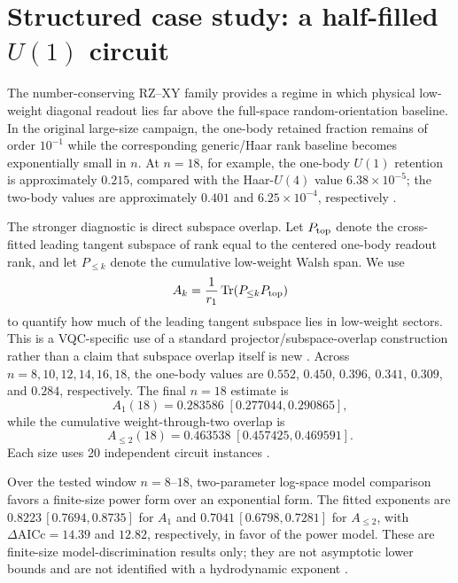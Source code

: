 \documentclass[aps,prx,reprint,superscriptaddress,nofootinbib,longbibliography]{revtex4-2}
\newcommand{\Tr}{\operatorname{Tr}}
\begin{document}
\section{Structured case study: a half-filled $U(1)$ circuit}

The number-conserving RZ--XY family provides a regime in which physical low-weight diagonal readout lies far above the full-space random-orientation baseline. In the original large-size campaign, the one-body retained fraction remains of order $10^{-1}$ while the corresponding generic/Haar rank baseline becomes exponentially small in $n$. At $n=18$, for example, the one-body $U(1)$ retention is approximately $0.215$, compared with the Haar-$U(4)$ value $6.38\times10^{-5}$; the two-body values are approximately $0.401$ and $6.25\times10^{-4}$, respectively \cite{AitHaddou2026MeasurementAccessible}.

The stronger diagnostic is direct subspace overlap. Let $P_{\rm top}$ denote the cross-fitted leading tangent subspace of rank equal to the centered one-body readout rank, and let $P_{\le k}$ denote the cumulative low-weight Walsh span. We use
\begin{equation}
A_k=\frac{1}{r_1}\Tr(P_{\le k}P_{\rm top})
\label{eq:Ak}
\end{equation}
to quantify how much of the leading tangent subspace lies in low-weight sectors. This is a VQC-specific use of a standard projector/subspace-overlap construction rather than a claim that subspace overlap itself is new \cite{Fernandez2025}. Across $n=8,10,12,14,16,18$, the one-body values are $0.552$, $0.450$, $0.396$, $0.341$, $0.309$, and $0.284$, respectively. The final $n=18$ estimate is
\begin{equation}
A_1(18)=0.283586\;[0.277044,0.290865],
\end{equation}
while the cumulative weight-through-two overlap is
\begin{equation}
A_{\le2}(18)=0.463538\;[0.457425,0.469591].
\end{equation}
Each size uses 20 independent circuit instances \cite{AitHaddou2026MeasurementAccessible}.

Over the tested window $n=8$--$18$, two-parameter log-space model comparison favors a finite-size power form over an exponential form. The fitted exponents are $0.8223\,[0.7694,0.8735]$ for $A_1$ and $0.7041\,[0.6798,0.7281]$ for $A_{\le2}$, with $\Delta\mathrm{AICc}=14.39$ and $12.82$, respectively, in favor of the power model. These are finite-size model-discrimination results only; they are not asymptotic lower bounds and are not identified with a hydrodynamic exponent \cite{AitHaddou2026MeasurementAccessible}.
\end{document}
